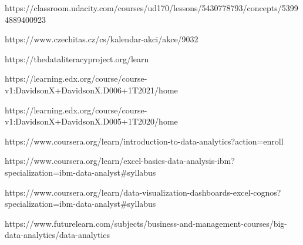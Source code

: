 https://classroom.udacity.com/courses/ud170/lessons/5430778793/concepts/53994889400923

https://www.czechitas.cz/cs/kalendar-akci/akce/9032

https://thedataliteracyproject.org/learn

https://learning.edx.org/course/course-v1:DavidsonX+DavidsonX.D006+1T2021/home

https://learning.edx.org/course/course-v1:DavidsonX+DavidsonX.D005+1T2020/home

https://www.coursera.org/learn/introduction-to-data-analytics?action=enroll

https://www.coursera.org/learn/excel-basics-data-analysis-ibm?specialization=ibm-data-analyst\#syllabus

https://www.coursera.org/learn/data-visualization-dashboards-excel-cognos?specialization=ibm-data-analyst\#syllabus

https://www.futurelearn.com/subjects/business-and-management-courses/big-data-analytics/data-analytics
